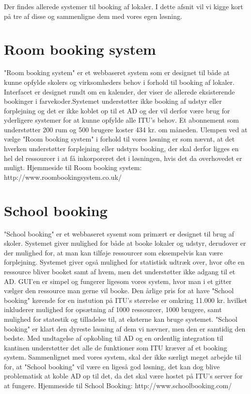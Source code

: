 Der findes allerede systemer til booking af lokaler. I dette afsnit vil vi kigge kort på tre af disse og sammenligne dem med vores egen løsning.

\section{Room booking system}
"Room booking system" er et webbaseret system som er designet til både at kunne opfylde skolers og virksomheders behov i forhold til booking af lokaler. Interfacet er designet rundt om en kalender, der viser de allerede eksisterende bookinger i farvekoder.Systemet understøtter ikke booking af udstyr eller forplejning og det er ikke koblet op til et AD og der vil derfor være brug for yderligere systemer for at kunne opfylde alle ITU's behov. Et abonnement som understøtter 200 rum og 500 brugere koster 434 kr. om måneden. Ulempen ved at vælge "Room booking system" i forhold til vores løsning er som nævnt, at det hverken understøtter forplejning eller udstyrs booking, der skal derfor ligges en hel del ressourcer i at få inkorporeret det i løsningen, hvis det da overhovedet er muligt.
Hjemmeside til Room booking system: http://www.roombookingsystem.co.uk/

\section{School booking}
"School booking" er et webbaseret sysemt som primært er designet til brug af skoler. Systemet giver mulighed for både at booke lokaler og udstyr, derudover er der mulighed for, at man kan tilføje ressourcer som eksempelvis kan være forplejning. Systemet giver også mulighed for statistisk udtræk over, hvor ofte en ressource bliver booket samt af hvem, men det understøtter ikke adgang til et AD. GUI'en er simpel og fungerer ligesom vores system, hvor man i et gitter vælger den ressource man gerne vil booke. Den årlige pris for at have "School booking" kørende for en instution på ITU's størrelse er omkring 11.000 kr. hvilket inkluderer mulighed for opsætning af 1000 ressourcer, 1000 brugere, samt mulighed for statestik og tilladelse til, at eksterne kan bruge systemet. "School booking" er klart den dyreste løsning af dem vi nævner, men den er samtidig den bedste. Med undtagelse af opkobling til AD og en ordentlig integration til kantinen understøtter det alle de funktioner som ITU kræver af et booking system. Sammenlignet med vores system, skal der ikke særligt meget arbejde til for, at "School booking" vil være en ligeså god løsning, det kan dog blive problematisk at koble AD op til det, da det skal være hostet på ITU's server for at fungere. 
Hjemmeside til School Booking: http://www.schoolbooking.com/


